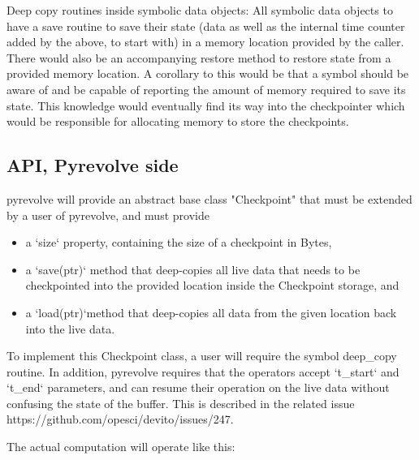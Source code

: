 \documentclass[sigconf]{acmart}
\begin{document}
Deep copy routines inside symbolic data objects: All symbolic data objects to have a save routine to save their state (data as well as the internal time counter added by the above, to start with) in a memory location provided by the caller. There would also be an accompanying restore method to restore state from a provided memory location. A corollary to this would be that a symbol should be aware of and be capable of reporting the amount of memory required to save its state. This knowledge would eventually find its way into the checkpointer which would be responsible for allocating memory to store the checkpoints.

\subsection{API, Pyrevolve side}

pyrevolve will provide an abstract base class "Checkpoint" that must be extended by a user of pyrevolve, and must provide

\begin{itemize}
\item a `size` property, containing the size of a checkpoint in Bytes,
\item a `save(ptr)` method that deep-copies all live data that needs to be checkpointed into the provided location inside the Checkpoint storage, and
\item a `load(ptr)`method that deep-copies all data from the given location back into the live data.
\end{itemize}

To implement this Checkpoint class, a user will require the symbol deep\_copy routine. In addition,
pyrevolve requires that the operators accept `t\_start` and `t\_end` parameters, and can resume
their operation on the live data without confusing the state of the buffer. This is described in the
related issue https://github.com/opesci/devito/issues/247.

The actual computation will operate like this:
\end{document}
